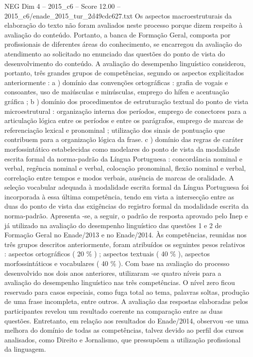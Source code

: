 \begin{textsample}{NEG Dim 4 – 2015\_c6 – Score 12.00 – 2015\_c6/enade\_2015\_tur\_2d49cdc627.txt}
Os aspectos macroestruturais da elaboração do texto não foram avaliados neste processo porque dizem respeito à avaliação do conteúdo.
Portanto, a banca de Formação Geral, composta por profissionais de diferentes áreas do conhecimento, se encarregou da avaliação do atendimento ao solicitado no enunciado das questões do ponto de vista do desenvolvimento do conteúdo.
A avaliação do desempenho linguístico considerou, portanto, três grandes grupos de competências, segundo os aspectos explicitados anteriormente : a ) domínio das convenções ortográficas : grafia de vogais e consoantes, uso de maiúsculas e minúsculas, emprego do hífen e acentuação gráfica ; b ) domínio dos procedimentos de estruturação textual do ponto de vista microestrutural : organização interna dos períodos, emprego de conectores para a articulação lógica entre os períodos e entre os parágrafos, emprego de marcas de referenciação lexical e pronominal ; utilização dos sinais de pontuação que contribuem para a organização lógica da frase. c ) domínio das regras de caráter morfossintático estabelecidas como modelares do ponto de vista da modalidade escrita formal da norma-padrão da Língua Portuguesa : concordância nominal e verbal, regência nominal e verbal, colocação pronominal, flexão nominal e verbal, correlação entre tempos e modos verbais, ausência de marcas de oralidade.
A seleção vocabular adequada à modalidade escrita formal da Língua Portuguesa foi incorporada à essa última competência, tendo em vista a intersecção entre as duas do ponto de vista das exigências do registro formal da modalidade escrita da norma-padrão.
Apresenta -se, a seguir, o padrão de resposta aprovado pelo Inep e já utilizado na avaliação do desempenho linguístico das questões 1 e 2 de Formação Geral no Enade/2013 e no Enade/2014.
Às competências, reunidas nos três grupos descritos anteriormente, foram atribuídos os seguintes pesos relativos : aspectos ortográficos ( 20 \% ) ; aspectos textuais ( 40 \% ), aspectos morfossintáticos e vocabulares ( 40 \% ).
Com base na avaliação do processo desenvolvido nos dois anos anteriores, utilizaram -se quatro níveis para a avaliação do desempenho linguístico nas três competências.
O nível zero ficou reservado para casos especiais, como fuga total ao tema, palavras soltas, produção de uma frase incompleta, entre outros.
A avaliação das respostas elaboradas pelos participantes revelou um resultado coerente na comparação entre as duas questões.
Entretanto, em relação aos resultados do Enade/2014, observou -se uma melhora do domínio de todas as competências, talvez devido ao perfil dos cursos analisados, como Direito e Jornalismo, que pressupõem a utilização profissional da linguagem.

\end{textsample}
